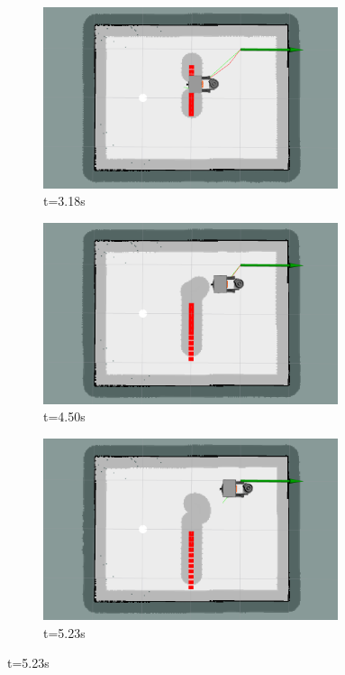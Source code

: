 \begin{figure}[H]
\begin{subfigure}[b]{0.30\linewidth}
    \end{subfigure}
    \begin{subfigure}[b]{0.30\linewidth}
        \centering
        \includegraphics[width=0.95\textwidth]{images/eband_2_single_1_obs/1/5318.png} \caption{t=3.18s}
    \end{subfigure}%
    \begin{subfigure}[b]{0.30\linewidth}
        \centering
        \includegraphics[width=0.95\textwidth]{images/eband_2_single_1_obs/1/5450.png} \caption{t=4.50s}
    \end{subfigure}%
    \begin{subfigure}[b]{0.30\linewidth}
        \centering
        \includegraphics[width=0.95\textwidth]{images/eband_2_single_1_obs/1/5523.png} \caption{t=5.23s}

\end{subfigure}
\end{figure}
